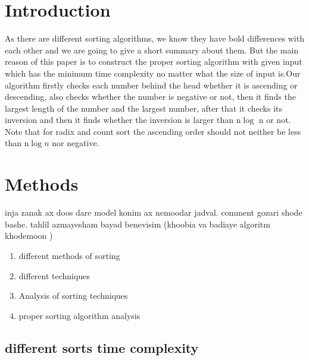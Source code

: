 \documentclass[
10pt, %
a4paper, %
oneside, %
headinclude,footinclude, %
BCOR5mm, %
]{scrartcl}
\begin{document}
\section{Introduction}

As there are different sorting algorithms, we know they have  
bold differences with each other and we are going to give a short summary about them. But the main reason of this paper is to construct the proper sorting algorithm with given input which has the minimum time complexity no matter what the size of input is.Our algorithm firstly checks each number behind the head whether it is ascending or descending, also checks whether the number is negative or not, then it finds the largest length of the number and the largest number, after that it checks its inversion and then it finds whether the inversion is larger than n$\log$ n or not. Note that for radix and count sort the ascending order should not neither be less than n$\log n$ nor negative.

\section{Methods}

inja zanak ax doos dare model konim ax nemoodar jadval.  comment gozari shode bashe.
tahlil azmayesham bayad benevisim (khoobia va badiaye algoritm khodemoon )
\begin{enumerate}[noitemsep]
\item different methods of sorting
\item different techniques
\item Analysis of sorting techniques 
\item proper sorting algorithm analysis
\end{enumerate}


\subsection{different sorts time complexity}
\end{document}

